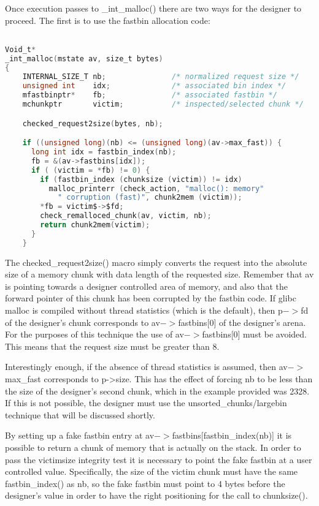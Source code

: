 \documentclass[12pt]{article}
\begin{document}
Once execution passes to \_int\_malloc() there are two ways for the
designer to proceed. The first is to use the fastbin allocation
code:
\begin{lstlisting}[language=C]

Void_t*
_int_malloc(mstate av, size_t bytes)
{
    INTERNAL_SIZE_T nb;               /* normalized request size */
    unsigned int    idx;              /* associated bin index */
    mfastbinptr*    fb;               /* associated fastbin */
    mchunkptr       victim;           /* inspected/selected chunk */

    checked_request2size(bytes, nb);

    if ((unsigned long)(nb) <= (unsigned long)(av->max_fast)) {
      long int idx = fastbin_index(nb);
      fb = &(av->fastbins[idx]);
      if ( (victim = *fb) != 0) {
        if (fastbin_index (chunksize (victim)) != idx)
          malloc_printerr (check_action, "malloc(): memory"
            " corruption (fast)", chunk2mem (victim));
        *fb = victim$->$fd;
        check_remalloced_chunk(av, victim, nb);
        return chunk2mem(victim);
      }
    }
\end{lstlisting}
The checked\_request2size() macro simply converts the request into
the absolute size of a memory chunk with data length of the
requested size. Remember that av is pointing towards a designer
controlled area of memory, and also that the forward pointer of
this chunk has been corrupted by the fastbin code. If glibc malloc
is compiled without thread statistics (which is the default), then
p$->$fd of the designer's chunk corresponds to av$->$fastbins[0] of the
designer's arena. For the purposes of this technique the use of av$->$fastbins[0] must be avoided. This means that the request size must
be greater than 8.
\newline


Interestingly enough, if the absence of thread statistics is
assumed, then av$->$max\_fast corresponds to p->size. This has the
effect of forcing nb to be less than the size of the designer's
second chunk, which in the example provided was 2328. If this is
not possible, the designer must use the unsorted\_chunks/largebin
technique that will be discussed shortly.
\newline


By setting up a fake fastbin entry at av$->$fastbins[fastbin\_index(nb)] it is possible to return a chunk of
memory that is actually on the stack. In order to pass the
victimsize integrity test it is necessary to point the fake fastbin
at a user controlled value. Specifically, the size of the victim
chunk must have the same fastbin\_index() as nb, so the fake fastbin
must point to 4 bytes before the designer's value in order to have
the right positioning for the call to chunksize().
\newline
\end{document}
